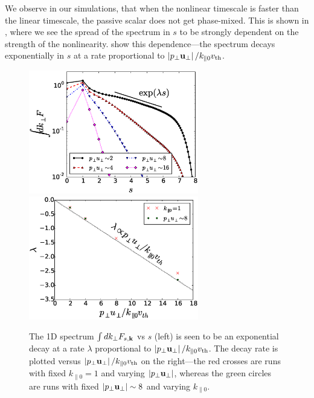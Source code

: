    We observe in our simulations, that when the nonlinear timescale is faster than the linear timescale, the passive scalar
    does not get phase-mixed. This is shown in , where we see
    the spread of the spectrum in $s$ to be strongly dependent on the strength of the
    nonlinearity.  show this dependence---the spectrum decays exponentially in
    $s$ at a rate proportional to $\left|p_\perp \mathbf{u_\perp}\right|/k_{\parallel0}v_{\rm th}$. 
    \begin{figure}
    \begin{center}
        \includegraphics[width=7.4cm]{figs/phmixnlpp0/M100_vss.eps}
        \includegraphics[width=7.4cm]{figs/phmixnlpp0/lambda_vs_gperp.eps}
        \caption{The 1D spectrum $\int dk_\perp F_{s,\mathbf{k}}$ vs $s$ (left) is seen to be an exponential
        decay at a rate $\lambda$ proportional to $\left|p_\perp \mathbf{u_\perp}\right|/k_{\parallel0}v_{\rm th}$. The decay rate
        is plotted versus $\left|p_\perp \mathbf{u_\perp}\right|/k_{\parallel0}v_{\rm th}$ on the right---the red crosses are
        runs with fixed $k_{\parallel0}=1$ and varying $\left|p_\perp \mathbf{u_\perp}\right|$, whereas the green circles
        are runs with fixed $\left|p_\perp \mathbf{u_\perp}\right| \sim 8$ and varying $k_{\parallel0}$.}
        \label{pp0:fig:vss}
    \end{center}
    \end{figure}
